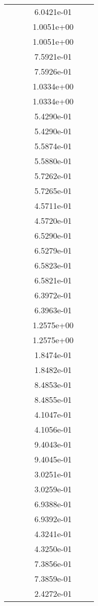 \begin{xltabular}{\textwidth}{r|rS[table-format=1.3e+2]S[table-format=1.4e+2]S[table-format=1.4e+2]S[table-format=-1.5]}
&  &  & 6.0421e-01 & & \\
&  &  & 1.0051e+00 & & \\
&  &  & 1.0051e+00 & & \\
&  &  & 7.5921e-01 & & \\
&  &  & 7.5926e-01 & & \\
&  &  & 1.0334e+00 & & \\
&  &  & 1.0334e+00 & & \\
&  &  & 5.4290e-01 & & \\
&  &  & 5.4290e-01 & & \\
&  &  & 5.5874e-01 & & \\
&  &  & 5.5880e-01 & & \\
&  &  & 5.7262e-01 & & \\
&  &  & 5.7265e-01 & & \\
&  &  & 4.5711e-01 & & \\
&  &  & 4.5720e-01 & & \\
&  &  & 6.5290e-01 & & \\
&  &  & 6.5279e-01 & & \\
&  &  & 6.5823e-01 & & \\
&  &  & 6.5821e-01 & & \\
&  &  & 6.3972e-01 & & \\
&  &  & 6.3963e-01 & & \\
&  &  & 1.2575e+00 & & \\
&  &  & 1.2575e+00 & & \\
&  &  & 1.8474e-01 & & \\
&  &  & 1.8482e-01 & & \\
&  &  & 8.4853e-01 & & \\
&  &  & 8.4855e-01 & & \\
&  &  & 4.1047e-01 & & \\
&  &  & 4.1056e-01 & & \\
&  &  & 9.4043e-01 & & \\
&  &  & 9.4045e-01 & & \\
&  &  & 3.0251e-01 & & \\
&  &  & 3.0259e-01 & & \\
&  &  & 6.9388e-01 & & \\
&  &  & 6.9392e-01 & & \\
&  &  & 4.3241e-01 & & \\
&  &  & 4.3250e-01 & & \\
&  &  & 7.3856e-01 & & \\
&  &  & 7.3859e-01 & & \\
&  &  & 2.4272e-01 & & \\

\end{xltabular}
